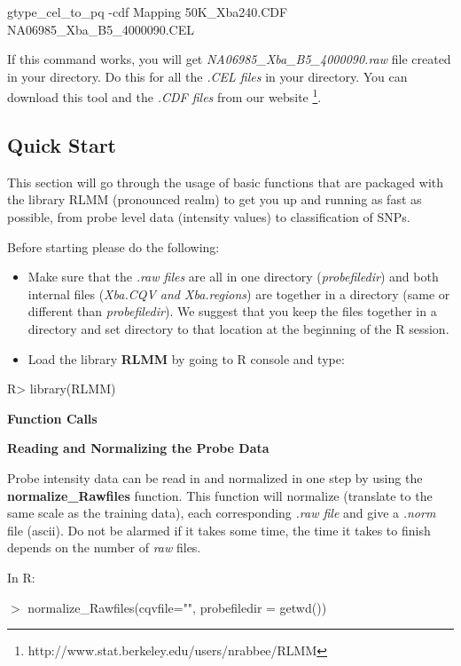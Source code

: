 \documentclass[12pt]{article}
\begin{document}
\medskip
\noindent
\textdollar gtype\_cel\_to\_pq -cdf Mapping 50K\_Xba240.CDF NA06985\_Xba\_B5\_4000090.CEL
\medskip

\noindent
If this command works, you will get { \it NA06985\_Xba\_B5\_4000090.raw} file created in your directory. 
Do this for all the {\it .CEL files} in your directory. You can download this tool and the {\it .CDF files}
from our website {\footnote {http://www.stat.berkeley.edu/users/nrabbee/RLMM}}.

\subsection{Quick Start}
This section will go through the usage of basic functions that are packaged with the library RLMM (pronounced realm) 
to get you up and running as fast as possible, from probe level data (intensity values) to classification of SNPs.

\medskip
\noindent
Before starting please do the following:

\begin{itemize}
\item Make sure that the {\it .raw files} are all in one directory ({\it probefiledir}) and both 
internal files ({\it Xba.CQV and Xba.regions}) are together in a directory (same or different than { \it probefiledir}). 
We suggest that you keep the files together in a directory and set directory to that location at the beginning of the R session.
\item Load the library {\bf RLMM} by going to R console and type:
\end{itemize}

\medskip
R> library(RLMM)

\medskip
\noindent
{\bf Function Calls}

\medskip
\noindent
{\bf Reading and Normalizing the Probe Data}
\smallskip

\noindent
Probe intensity data can be read in and normalized in one step by using the {\bf normalize\_Rawfiles} function. This function will 
normalize (translate to the same scale as the training data), each corresponding {\it .raw file} and give a {\it .norm} file (ascii). 
Do not be alarmed if it takes some time, the time it takes to finish depends on the number of {\it raw} files. 

\medskip
\noindent
In R:

\smallskip
\noindent
$>$ normalize\_Rawfiles(cqvfile="", probefiledir = getwd())
\medskip
\end{document}
